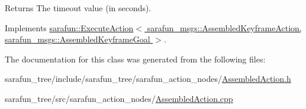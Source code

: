 \begin{DoxyReturn}{Returns}
The timeout value (in seconds). 
\end{DoxyReturn}


Implements \hyperlink{classsarafun_1_1ExecuteAction_aba6cfa8a8ce19e735eb6394424df6d17}{sarafun\-::\-Execute\-Action$<$ sarafun\-\_\-msgs\-::\-Assembled\-Keyframe\-Action, sarafun\-\_\-msgs\-::\-Assembled\-Keyframe\-Goal $>$}.



The documentation for this class was generated from the following files\-:\begin{DoxyCompactItemize}
\item 
sarafun\-\_\-tree/include/sarafun\-\_\-tree/sarafun\-\_\-action\-\_\-nodes/\hyperlink{AssembledAction_8h}{Assembled\-Action.\-h}\item 
sarafun\-\_\-tree/src/sarafun\-\_\-action\-\_\-nodes/\hyperlink{AssembledAction_8cpp}{Assembled\-Action.\-cpp}\end{DoxyCompactItemize}
